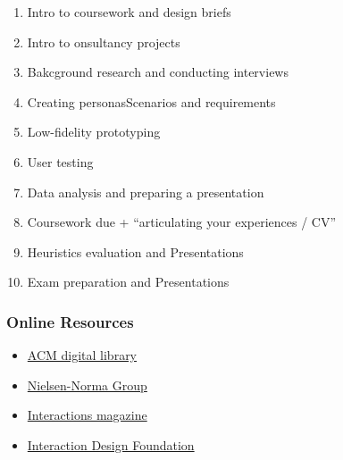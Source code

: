 \documentclass[a4paper]{article}
\begin{document}
\begin{enumerate}
    \item Intro to coursework and design briefs
    \item Intro to onsultancy projects
    \item Bakcground research and conducting interviews
    \item Creating personasScenarios and requirements
    \item Low-fidelity prototyping
    \item User testing
    \item Data analysis and preparing a presentation
    \item Coursework due + ``articulating your experiences / CV''
    \item Heuristics evaluation and Presentations
    \item Exam preparation and Presentations
\end{enumerate}

\subsubsection{Online Resources}
\begin{itemize}
    \item \href{https://dl.acm.org}{ACM digital library}
    \item \href{https://www.nngroup.com/articles/}{Nielsen-Norma Group}
    \item \href{https://interactions.acm.org}{Interactions magazine}
    \item \href{https://www.interaction-design.org/}{Interaction Design Foundation}
\end{itemize}


\end{document}
